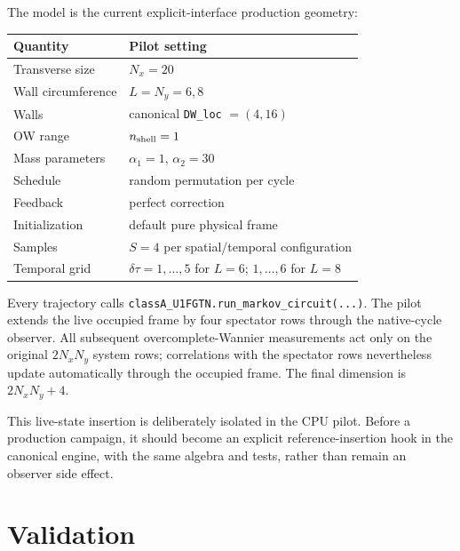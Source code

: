\documentclass[10pt]{article}
\begin{document}
The model is the current explicit-interface production geometry:
\begin{center}
\begin{tabular}{ll}
\toprule
Quantity & Pilot setting\\
\midrule
Transverse size & $N_x=20$\\
Wall circumference & $L=N_y=6,8$\\
Walls & canonical \texttt{DW\_loc} $=(4,16)$\\
OW range & $n_{\rm shell}=1$\\
Mass parameters & $\alpha_1=1$, $\alpha_2=30$\\
Schedule & random permutation per cycle\\
Feedback & perfect correction\\
Initialization & default pure physical frame\\
Samples & $S=4$ per spatial/temporal configuration\\
Temporal grid & $\delta\tau=1,\ldots,5$ for $L=6$; $1,\ldots,6$ for $L=8$\\
\bottomrule
\end{tabular}
\end{center}

Every trajectory calls
\texttt{classA\_U1FGTN.run\_markov\_circuit(...)}.  The pilot extends the live
occupied frame by four spectator rows through the native-cycle observer.  All
subsequent overcomplete-Wannier measurements act only on the original
$2N_xN_y$ system rows; correlations with the spectator rows nevertheless
update automatically through the occupied frame.  The final dimension is
$2N_xN_y+4$.

This live-state insertion is deliberately isolated in the CPU pilot.  Before a
production campaign, it should become an explicit reference-insertion hook in
the canonical engine, with the same algebra and tests, rather than remain an
observer side effect.

\section{Validation}
\end{document}
